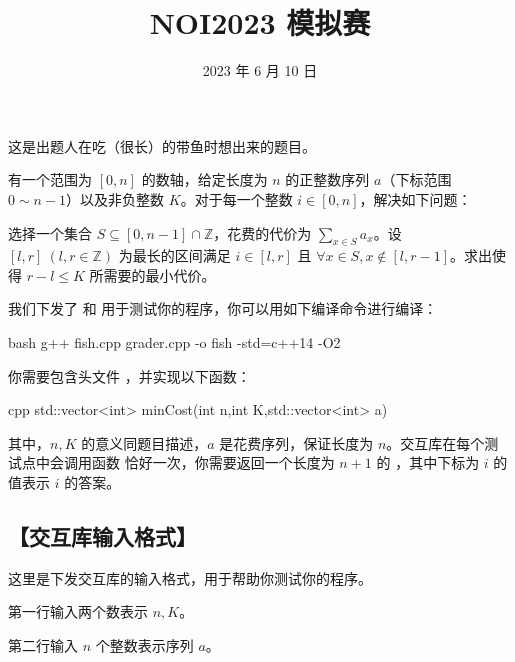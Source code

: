 \documentclass{oicontest}
\begin{document}
\title{NOI2023 模拟赛}
\author{}
\date{2023 年 6 月 10 日}


\background

这是出题人在吃（很长）的带鱼时想出来的题目。

\probdescription


有一个范围为 $[0,n]$ 的数轴，给定长度为 $n$ 的正整数序列 $a$（下标范围 $0\sim n-1$）以及非负整数 $K$。对于每一个整数 $i\in [0,n]$，解决如下问题：

选择一个集合 $S\subseteq [0,n-1]\cap\mathbb{Z}$，花费的代价为 $\sum_{x\in S}a_x$。设 $[l,r]\ (l,r\in\mathbb{Z})$ 为最长的区间满足 $i\in[l,r]$ 且 $\forall x\in S,x\notin [l,r-1]$。求出使得 $r-l\le K$ 所需要的最小代价。

我们下发了  和  用于测试你的程序，你可以用如下编译命令进行编译：

\begin{code}{bash}
g++ fish.cpp grader.cpp -o fish -std=c++14 -O2
\end{code}

\implement


你需要包含头文件 ，并实现以下函数：

\begin{code}{cpp}
std::vector<int> minCost(int n,int K,std::vector<int> a)
\end{code}

其中，$n,K$ 的意义同题目描述，$a$ 是花费序列，保证长度为 $n$。交互库在每个测试点中会调用函数  恰好一次，你需要返回一个长度为 $n+1$ 的 ，其中下标为 $i$ 的值表示 $i$ 的答案。


\subsection[交互库输入格式]{【交互库输入格式】}

这里是下发交互库的输入格式，用于帮助你测试你的程序。

第一行输入两个数表示 $n,K$。

第二行输入 $n$ 个整数表示序列 $a$。
\end{document}
